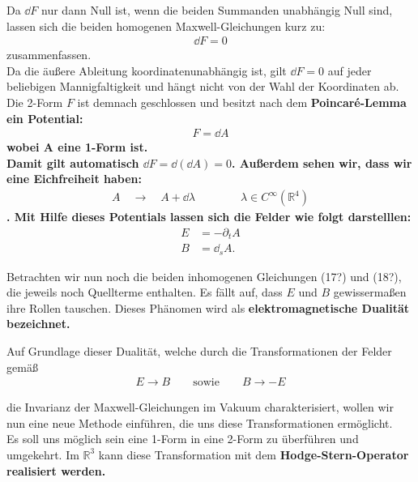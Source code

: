 Da $\dd F$ nur dann Null ist, wenn die beiden Summanden unabhängig Null sind, lassen sich die beiden homogenen Maxwell-Gleichungen kurz zu: 
\begin{align}
\dd F = 0
\end{align}
zusammenfassen. \\
Da die äußere Ableitung koordinatenunabhängig ist, gilt $\dd F = 0$ auf jeder beliebigen Mannigfaltigkeit und hängt nicht von der Wahl der Koordinaten ab. \\
Die 2-Form $F$ ist demnach geschlossen und besitzt nach dem \bfseries Poincaré-Lemma \normalfont ein Potential:
\begin{align}
F = \dd A 
\end{align}
wobei A eine 1-Form ist. \\
Damit gilt automatisch $ \dd F = \dd (\dd A) = 0$. Außerdem sehen wir, dass wir eine Eichfreiheit haben:
\begin{align}
A \quad \rightarrow \quad A + \dd \lambda \qquad\qquad \lambda \in C^{\infty}(\mathbb{R}^4)
\end{align}.
Mit Hilfe dieses Potentials lassen sich die Felder wie folgt darstelllen:
\begin{align}
E &= -\partial_t A \\
B &= \dd_s A.
\end{align}

Betrachten wir nun noch die beiden inhomogenen Gleichungen (17?) und (18?), die jeweils noch Quellterme enthalten. Es fällt auf, dass $E$ und $B$ gewissermaßen ihre Rollen tauschen. Dieses Phänomen wird als \bfseries elektromagnetische Dualität \normalfont bezeichnet.

Auf Grundlage dieser Dualität, welche durch die Transformationen der Felder gemäß
\begin{align*}
E \rightarrow B \qquad \text{sowie} \qquad B \rightarrow -E
\end{align*}

die Invarianz der Maxwell-Gleichungen im Vakuum charakterisiert, wollen wir nun eine neue Methode einführen, die uns diese Transformationen ermöglicht. \\
Es soll uns möglich sein eine 1-Form in eine 2-Form zu überführen und umgekehrt. Im $\mathbb{R}^3$ kann diese Transformation mit dem \bfseries Hodge-Stern-Operator \normalfont realisiert werden.
